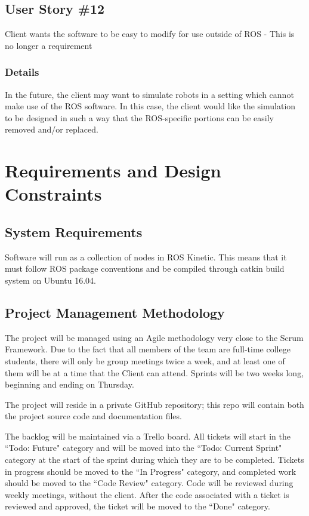 \subsection{User Story \#12\label{us:12}} 
Client wants the software to be easy to modify for use outside of ROS - This is no longer a requirement

\subsubsection*{Details}
In the future, the client may want to simulate robots in a setting which cannot make use of the ROS software. In this case, the client would like the simulation to be designed in such a way that the ROS-specific portions can be easily removed and/or replaced.

\section{Requirements and Design Constraints}
\subsection{System  Requirements}
Software will run as a collection of nodes in ROS Kinetic. This means that it must follow ROS package conventions and be compiled through catkin build system on Ubuntu 16.04.

\subsection{Project  Management Methodology}
The project will be managed using an Agile methodology very close to the Scrum Framework. Due to the fact that all members of the team are full-time college students, there will only be group meetings twice a week, and at least one of them will be at a time that the Client can attend. Sprints will be two weeks long, beginning and ending on Thursday.

The project will reside in a private GitHub repository; this repo will contain both the project source code and documentation files.

The backlog will be maintained via a Trello board. All tickets will start in the ``Todo: Future" category and will be moved into the ``Todo: Current Sprint" category at the start of the sprint during which they are to be completed. Tickets in progress should be moved to the ``In Progress" category, and completed work should be moved to the ``Code Review" category. Code will be reviewed during weekly meetings, without the client. After the code associated with a ticket is reviewed and approved, the ticket will be moved to the ``Done" category.

